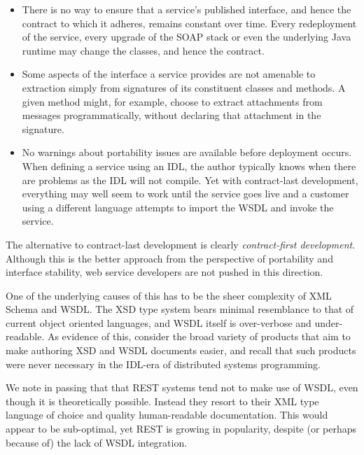 \begin{itemize}

\item
    
There is no way to ensure that a service's published interface, and
hence the contract to which it adheres, remains constant over
time. Every redeployment of the service, every upgrade of the SOAP
stack or even the underlying Java runtime may change the classes, and
hence the contract.

\item

Some aspects of the interface a service provides are not amenable to
extraction simply from signatures of its constituent classes and
methods. A given method might, for example, choose to extract
attachments from messages programmatically, without declaring that
attachment in the signature.

\item

No warnings about portability issues are available before deployment
occurs. When defining a service using an IDL, the author typically
knows when there are problems as the IDL will not compile. Yet with
contract-last development, everything may well seem to work until the
service goes live and a customer using a different language attempts
to import the WSDL and invoke the service.
    
\end{itemize}

The alternative to contract-last development is clearly \emph{contract-first
development}. Although this is the better approach from the perspective
of portability and interface stability, web service developers are not
pushed in this direction.

One of the underlying causes of this has to be the sheer complexity of
XML Schema and WSDL. The XSD type system bears minimal resemblance to
that of current object oriented languages, and WSDL itself is
over-verbose and under-readable. As evidence of this, consider the
broad variety of products that aim to make authoring XSD and WSDL
documents easier, and recall that such products were never necessary
in the IDL-era of distributed systems programming.

We note in passing that that REST systems \cite{fielding:rest} tend not to
make use of WSDL, even though it is theoretically possible. Instead
they resort to their XML type language of choice and quality
human-readable documentation. This would appear to be sub-optimal, yet
REST is growing in popularity, despite (or perhaps because of) the
lack of WSDL integration.


